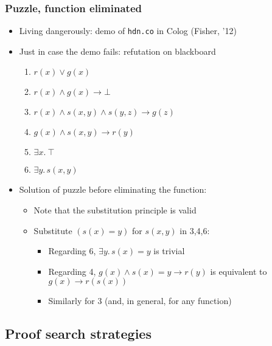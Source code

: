 \documentclass[handout,11pt]{beamer}
\newcommand{\weg}[1]{}
\newcommand{\imp}{\rightarrow}
\begin{document}
\begin{frame}
\frametitle{Puzzle, function eliminated}
 \begin{itemize}[<+->]
    \item Living dangerously: demo of {\tt hdn.co} in Colog (Fisher, '12)
    \item Just in case the demo fails: refutation on blackboard
    \begin{enumerate}
      \item $r(x) \vee g(x)$ 
      \item $r(x) \wedge g(x) \imp \bot$
      \item $r(x) \wedge s(x,y) \wedge s(y,z) \imp g(z)$ 
      \item $g(x) \wedge s(x,y) \imp r(y)$    
      \item $\exists x.~\top$
      \item $\exists y.\,s(x,y)$
  \end{enumerate}
  \item Solution of puzzle before eliminating 
  the function:
    \begin{itemize}
    \item Note that the substitution principle is valid
    \item Substitute $(s(x) = y)$ for $s(x,y)$ in 3,4,6:
     \begin{itemize}
     \item Regarding 6, $\exists y.\,s(x)=y$ is trivial   
     \item Regarding 4, $g(x) \wedge s(x)=y \imp r(y)$ is 
     equivalent to $g(x) \imp r(s(x))$
     \item Similarly for 3 (and, in general, for any function)   
     \end{itemize}
    \end{itemize}
  \end{itemize}
\end{frame}

\weg{
\begin{frame}
\frametitle{Example: Diamond property closed under reflexive closure}
\small
\end{frame}

\frame
  {    
    \frametitle{Search space} \vspace*{-.95in}
    \scalebox{0.40}
      {
    \texttt{[image: tree\_dpe]}
      }
  }
}%

\subsection{Proof search strategies}
\end{document}
